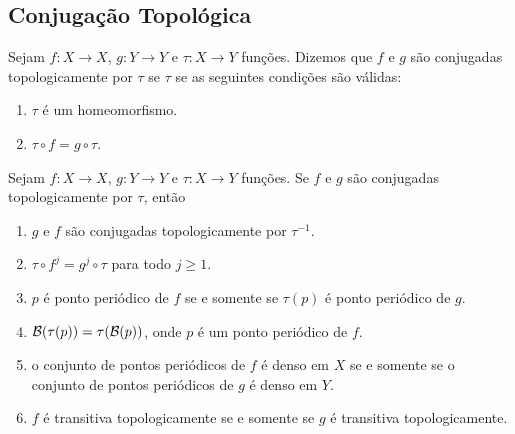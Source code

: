 \subsection{Conjugação Topológica}

\begin{definition}
Sejam $f: X \to X$, $g: Y \to Y$ e $\tau: X \to Y$ funções. Dizemos que $f$ e $g$ são conjugadas topologicamente por $\tau$ se $\tau$ se as seguintes condições são válidas:
\begin{enumerate}[label = \roman*.]
\item $\tau$ é um homeomorfismo.
\item $\tau \circ f = g \circ \tau$.
\end{enumerate}
\end{definition}

\begin{proposition}
\label{proposicao conjugacaotopologica 1}
Sejam $f: X \to X$, $g: Y \to Y$ e $\tau: X \to Y$ funções. Se $f$ e $g$ são conjugadas topologicamente por $\tau$, então
\begin{enumerate}
\item $g$ e $f$ são conjugadas topologicamente por $\tau^{-1}$.
\item $\tau \circ f^j = g^j \circ \tau$ para todo $j \geq 1$.
\item $p$ é ponto periódico de $f$ se e somente se $\tau(p)$ é ponto periódico de $g$.
\item $\mathcal{B}(\tau(p)) = \tau(\mathcal{B}(p))$, onde $p$ é um ponto periódico de $f$.
\item o conjunto de pontos periódicos de $f$ é denso em $X$ se e somente se o conjunto de pontos periódicos de $g$ é denso em $Y$.
\item $f$ é transitiva topologicamente se e somente se $g$ é transitiva topologicamente.
\end{enumerate}
\end{proposition}

